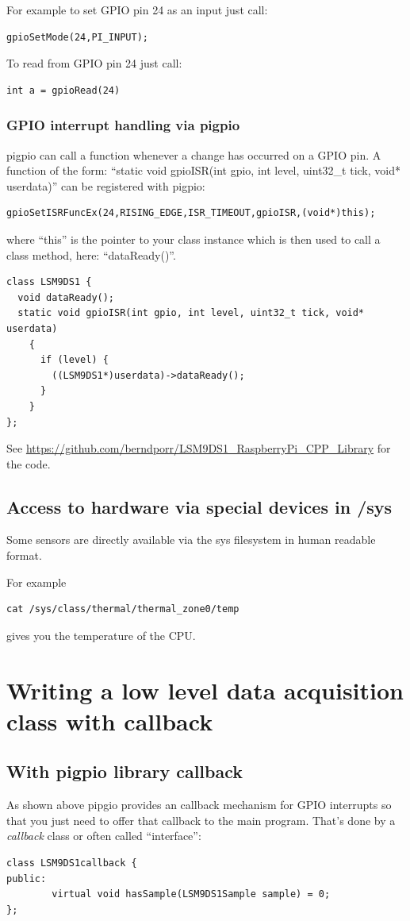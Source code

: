\documentclass[12pt]{article}
\begin{document}
For example to set GPIO pin 24 as an input just call:
\begin{verbatim}
gpioSetMode(24,PI_INPUT);
\end{verbatim}

To read from GPIO pin 24 just call:
\begin{verbatim}
int a = gpioRead(24)
\end{verbatim}

\subsubsection{GPIO interrupt handling via pigpio}
pigpio can call a function whenever a change has occurred on a GPIO pin.
A function of the form:
``static void gpioISR(int gpio, int level, uint32\_t tick, void* userdata)''
can be registered with pigpio:
\begin{verbatim}
gpioSetISRFuncEx(24,RISING_EDGE,ISR_TIMEOUT,gpioISR,(void*)this);
\end{verbatim}
where ``this'' is the pointer to your class instance which is then used
to call a class method, here: ``dataReady()''.
\begin{verbatim}
class LSM9DS1 {
  void dataReady();
  static void gpioISR(int gpio, int level, uint32_t tick, void* userdata)
    {
      if (level) {
        ((LSM9DS1*)userdata)->dataReady();
      }
    }
};
\end{verbatim}
See \url{https://github.com/berndporr/LSM9DS1_RaspberryPi_CPP_Library} for the code.

\subsection{Access to hardware via special devices in /sys}
Some sensors are directly available via the sys filesystem in human readable format.

For example
\begin{verbatim}
cat /sys/class/thermal/thermal_zone0/temp
\end{verbatim}
gives you the temperature of the CPU.


\section{Writing a low level data acquisition class with callback}
\subsection{With pigpio library callback}
As shown above pipgio provides an callback mechanism for GPIO interrupts
so that you just need
to offer that callback to the main program. That's done by a \textsl{callback}
class or often called ``interface'':
\begin{verbatim}
class LSM9DS1callback {
public:
        virtual void hasSample(LSM9DS1Sample sample) = 0;
};
\end{verbatim}
\end{document}
